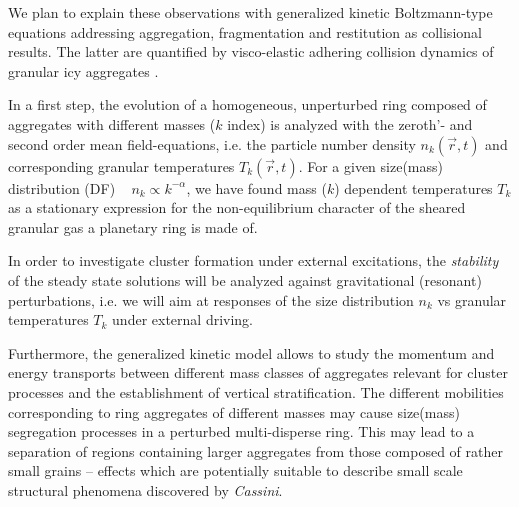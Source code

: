 \documentclass[11pt, notitlepage]{article} %
\begin{document}
We plan to explain these observations with generalized kinetic Boltzmann-type equations addressing aggregation, fragmentation and 
restitution \citep{spahn2004} as collisional results. The latter are quantified by visco-elastic adhering collision dynamics of granular icy aggregates 
\citep{brilliantov2007a}.

In a first step, the evolution of a homogeneous, unperturbed ring composed of aggregates with different masses ($k$ index) is analyzed with
the zeroth'- and second order mean field-equations, i.e.  the particle number density $n_k (\vec r, t)$ and corresponding granular 
temperatures $T_k (\vec r, t)$. For a given size(mass) distribution (DF) ~ $n_k  \propto k^{-\alpha}$, we have found mass ($k$) dependent  
temperatures $T_k $ as a stationary expression for the non-equilibrium character of the sheared granular gas a planetary ring is made of.

 In order to investigate cluster formation under external excitations, the \emph{stability} of the steady state solutions will be analyzed against 
 gravitational (resonant) perturbations, i.e. we will aim at responses of the size distribution $n_k$ vs granular temperatures $T_k$ under 
 external driving.   
  
    Furthermore, the generalized kinetic model allows to study the momentum and energy transports between different mass 
 classes of aggregates relevant for cluster processes and the establishment of vertical stratification.  The different mobilities 
 corresponding to ring aggregates of different masses may cause size(mass) segregation processes in a perturbed multi-disperse 
 ring. This may lead to a separation of regions containing larger aggregates from those composed of rather small grains -- effects 
 which are potentially suitable to describe small scale structural phenomena discovered by \emph{Cassini}.\\
 
\end{document}
